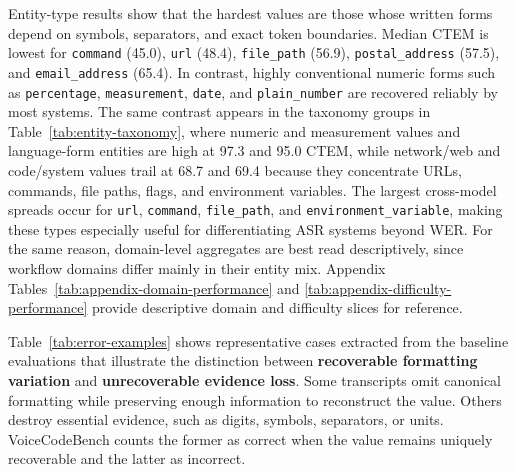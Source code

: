 \documentclass[10pt,twocolumn]{article}
\begin{document}
Entity-type results show that the hardest values are those whose written
forms depend on symbols, separators, and exact token boundaries. Median
CTEM is lowest for \texttt{command} (45.0), \texttt{url} (48.4),
\texttt{file\_path} (56.9), \texttt{postal\_address} (57.5), and
\texttt{email\_address} (65.4). In contrast, highly conventional
numeric forms such as \texttt{percentage}, \texttt{measurement},
\texttt{date}, and \texttt{plain\_number} are recovered reliably by
most systems. The same contrast appears in the taxonomy groups in
Table~\ref{tab:entity-taxonomy}, where numeric and measurement values and
language-form entities are high at 97.3 and 95.0 CTEM, while network/web
and code/system values trail at 68.7 and 69.4 because they concentrate
URLs, commands, file paths, flags, and environment variables. The largest
cross-model spreads occur for \texttt{url},
\texttt{command}, \texttt{file\_path}, and
\texttt{environment\_variable}, making these types especially useful
for differentiating ASR systems beyond WER\@. For the same reason,
domain-level aggregates are best read descriptively, since workflow
domains differ mainly in their entity mix. Appendix
Tables~\ref{tab:appendix-domain-performance} and
\ref{tab:appendix-difficulty-performance} provide descriptive domain and
difficulty slices for reference.

Table~\ref{tab:error-examples} shows representative cases extracted
from the baseline evaluations that illustrate the distinction between
\textbf{recoverable formatting variation} and \textbf{unrecoverable
	evidence loss}. Some transcripts omit canonical formatting while
preserving enough information to reconstruct the value. Others destroy
essential evidence, such as digits, symbols, separators, or units.
VoiceCodeBench counts the former as correct when the value remains
uniquely recoverable and the latter as incorrect.
\end{document}
